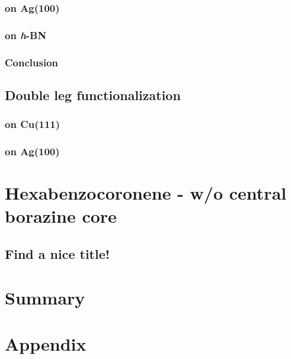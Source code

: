 \documentclass[
10pt,					%
a4paper,				%
twoside,				%
BCOR=8mm,				%
headings=normal,		%
headsepline,			%
footsepline,			%
plainfootsepline,		%
]{scrbook}
\begin{document}
   \subsection{on Ag(100)}
      
   \subsection{on \textit{h}-BN}
      
	\subsection{Conclusion}
      
  \section{Double leg functionalization}
   \subsection{on Cu(111)}
      
   \subsection{on Ag(100)}
      
\chapter{Hexabenzocoronene - w/o central borazine core}
	\section{Find a nice title!}
		

\chapter{Summary}
      
\backmatter{}
  \printbibliography  
\chapter{Appendix}
%  
\end{document}

